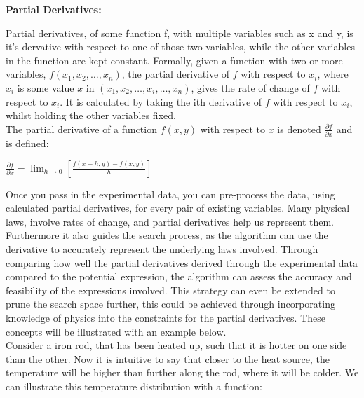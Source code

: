 \documentclass{article}
\begin{document}
\begin{center} 
  \textbf {\Large Partial Derivatives:}
\end{center}

Partial derivatives, of some function f, with multiple variables such as x and y, is it's dervative with respect to one of those two variables, while the other variables in the function are kept constant. Formally, given a function with two or more variables, $f(x_1, x_2, \ldots, x_n) $, the partial derivative of $f$ with respect to $x_i$, where $x_i$ is some value $x$ in $(x_1, x_2, \ldots, x_i, \ldots, x_n)$, gives the rate of change of $f$ with respect to $x_i$. It is calculated by taking the ith derivative of $f$ with respect to $x_i$, whilst holding the other variables fixed. \cite{Stewart2012} \cite{Smith2012} \\

The partial derivative of a function $f(x,y)$ with respect to $x$ is denoted $\frac{\partial f}{\partial x}$ \cite{Kelly2021} and is defined: \\ 

\begin{center}

  $\frac{\partial f}{\partial x} = \lim_{h \to 0} \left[ \frac{f(x+h, y) - f(x,y)}{h} \right]$
\end{center}


Once you pass in the experimental data, you can pre-process the data, using calculated partial derivatives, for every pair of existing variables. Many physical laws, involve rates of change, and partial
derivatives help us represent them. Furthermore it also guides the search process, as the algorithm can
use the derivative to accurately represent the underlying laws involved. Through comparing how well
the partial derivatives derived through the experimental data compared to the potential expression,
the algorithm can assess the accuracy and feasibility of the expressions involved. This strategy can
even be extended to prune the search space further, this could be achieved through incorporating
knowledge of physics into the constraints for the partial derivatives. These concepts will be illustrated
with an example below.\\


Consider a iron rod, that has been heated up, such that it is hotter on one side than the other. Now it is intuitive to say that closer to the heat source, the temperature will be higher than further along the rod, where it will be colder. We can illustrate this temperature distribution with a function:  \\
\end{document}
